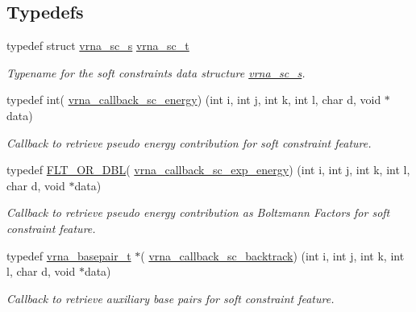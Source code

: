 \subsection*{Typedefs}
\begin{DoxyCompactItemize}
\item 
typedef struct \hyperlink{group__soft__constraints_structvrna__sc__s}{vrna\+\_\+sc\+\_\+s} \hyperlink{group__soft__constraints_ga75401ce219ef8dbcceb672db82d434c6}{vrna\+\_\+sc\+\_\+t}\hypertarget{group__soft__constraints_ga75401ce219ef8dbcceb672db82d434c6}{}\label{group__soft__constraints_ga75401ce219ef8dbcceb672db82d434c6}

\begin{DoxyCompactList}\small\item\em Typename for the soft constraints data structure \hyperlink{group__soft__constraints_structvrna__sc__s}{vrna\+\_\+sc\+\_\+s}. \end{DoxyCompactList}\item 
typedef int( \hyperlink{group__soft__constraints_gaf38062858ac25fd5e240c2c3b0b0b780}{vrna\+\_\+callback\+\_\+sc\+\_\+energy}) (int i, int j, int k, int l, char d, void $\ast$data)
\begin{DoxyCompactList}\small\item\em Callback to retrieve pseudo energy contribution for soft constraint feature. \end{DoxyCompactList}\item 
typedef \hyperlink{group__data__structures_ga31125aeace516926bf7f251f759b6126}{F\+L\+T\+\_\+\+O\+R\+\_\+\+D\+BL}( \hyperlink{group__soft__constraints_ga2eade8745c163a553763be4cfe2a679b}{vrna\+\_\+callback\+\_\+sc\+\_\+exp\+\_\+energy}) (int i, int j, int k, int l, char d, void $\ast$data)
\begin{DoxyCompactList}\small\item\em Callback to retrieve pseudo energy contribution as Boltzmann Factors for soft constraint feature. \end{DoxyCompactList}\item 
typedef \hyperlink{group__data__structures_gac8c5669d3fb813cacf506489689305ce}{vrna\+\_\+basepair\+\_\+t} $\ast$( \hyperlink{group__soft__constraints_gaa216f513c3b0bd6fe5807dd0c53a8e5a}{vrna\+\_\+callback\+\_\+sc\+\_\+backtrack}) (int i, int j, int k, int l, char d, void $\ast$data)
\begin{DoxyCompactList}\small\item\em Callback to retrieve auxiliary base pairs for soft constraint feature. \end{DoxyCompactList}\end{DoxyCompactItemize}
